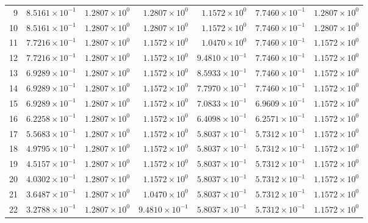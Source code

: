 \begin{table}[H]
\begin{tabular}{@{}rrrrrrr@{}}
9 & $8.5161\times10^{-1}$ & $1.2807\times10^{0}$ & $1.2807\times10^{0}$ & $1.1572\times10^{0}$ & $7.7460\times10^{-1}$ & $1.2807\times10^{0}$\\
10 & $8.5161\times10^{-1}$ & $1.2807\times10^{0}$ & $1.2807\times10^{0}$ & $1.1572\times10^{0}$ & $7.7460\times10^{-1}$ & $1.2807\times10^{0}$\\
11 & $7.7216\times10^{-1}$ & $1.2807\times10^{0}$ & $1.1572\times10^{0}$ & $1.0470\times10^{0}$ & $7.7460\times10^{-1}$ & $1.1572\times10^{0}$\\
12 & $7.7216\times10^{-1}$ & $1.2807\times10^{0}$ & $1.1572\times10^{0}$ & $9.4810\times10^{-1}$ & $7.7460\times10^{-1}$ & $1.1572\times10^{0}$\\
13 & $6.9289\times10^{-1}$ & $1.2807\times10^{0}$ & $1.1572\times10^{0}$ & $8.5933\times10^{-1}$ & $7.7460\times10^{-1}$ & $1.1572\times10^{0}$\\
14 & $6.9289\times10^{-1}$ & $1.2807\times10^{0}$ & $1.1572\times10^{0}$ & $7.7970\times10^{-1}$ & $7.7460\times10^{-1}$ & $1.1572\times10^{0}$\\
15 & $6.9289\times10^{-1}$ & $1.2807\times10^{0}$ & $1.1572\times10^{0}$ & $7.0833\times10^{-1}$ & $6.9609\times10^{-1}$ & $1.1572\times10^{0}$\\
16 & $6.2258\times10^{-1}$ & $1.2807\times10^{0}$ & $1.1572\times10^{0}$ & $6.4098\times10^{-1}$ & $6.2571\times10^{-1}$ & $1.1572\times10^{0}$\\
17 & $5.5683\times10^{-1}$ & $1.2807\times10^{0}$ & $1.1572\times10^{0}$ & $5.8037\times10^{-1}$ & $5.7312\times10^{-1}$ & $1.1572\times10^{0}$\\
18 & $4.9795\times10^{-1}$ & $1.2807\times10^{0}$ & $1.1572\times10^{0}$ & $5.8037\times10^{-1}$ & $5.7312\times10^{-1}$ & $1.1572\times10^{0}$\\
19 & $4.5157\times10^{-1}$ & $1.2807\times10^{0}$ & $1.1572\times10^{0}$ & $5.8037\times10^{-1}$ & $5.7312\times10^{-1}$ & $1.1572\times10^{0}$\\
20 & $4.0302\times10^{-1}$ & $1.2807\times10^{0}$ & $1.1572\times10^{0}$ & $5.8037\times10^{-1}$ & $5.7312\times10^{-1}$ & $1.1572\times10^{0}$\\
21 & $3.6487\times10^{-1}$ & $1.2807\times10^{0}$ & $1.0470\times10^{0}$ & $5.8037\times10^{-1}$ & $5.7312\times10^{-1}$ & $1.1572\times10^{0}$\\
22 & $3.2788\times10^{-1}$ & $1.2807\times10^{0}$ & $9.4810\times10^{-1}$ & $5.8037\times10^{-1}$ & $5.7312\times10^{-1}$ & $1.1572\times10^{0}$\\

\end{tabular}
\end{table}
